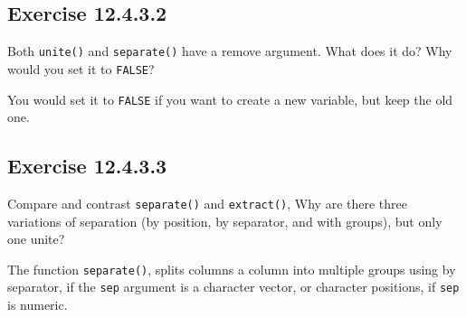 \documentclass[]{book}
\newenvironment{Shaded}{\begin{snugshade}}{\end{snugshade}}
\newcommand{\CommentTok}[1]{\textcolor[rgb]{0.56,0.35,0.01}{\textit{#1}}}
\newcommand{\DataTypeTok}[1]{\textcolor[rgb]{0.13,0.29,0.53}{#1}}
\newcommand{\KeywordTok}[1]{\textcolor[rgb]{0.13,0.29,0.53}{\textbf{#1}}}
\newcommand{\NormalTok}[1]{#1}
\newcommand{\OperatorTok}[1]{\textcolor[rgb]{0.81,0.36,0.00}{\textbf{#1}}}
\newcommand{\StringTok}[1]{\textcolor[rgb]{0.31,0.60,0.02}{#1}}
\theoremstyle{plain}
\theoremstyle{remark}
\begin{document}
\begin{Shaded}
\end{Shaded}

\hypertarget{exercise-12.4.3.2}{%
\subsection*{\texorpdfstring{Exercise
{12.4.3.2}}{Exercise 12.4.3.2}}\label{exercise-12.4.3.2}}

Both \texttt{unite()} and \texttt{separate()} have a remove argument.
What does it do? Why would you set it to \texttt{FALSE}?

You would set it to \texttt{FALSE} if you want to create a new variable,
but keep the old one.

\hypertarget{exercise-12.4.3.3}{%
\subsection*{\texorpdfstring{Exercise
{12.4.3.3}}{Exercise 12.4.3.3}}\label{exercise-12.4.3.3}}

Compare and contrast \texttt{separate()} and \texttt{extract()}, Why are
there three variations of separation (by position, by separator, and
with groups), but only one unite?

The function \texttt{separate()}, splits columns a column into multiple
groups using by separator, if the \texttt{sep} argument is a character
vector, or character positions, if \texttt{sep} is numeric.
\end{document}
